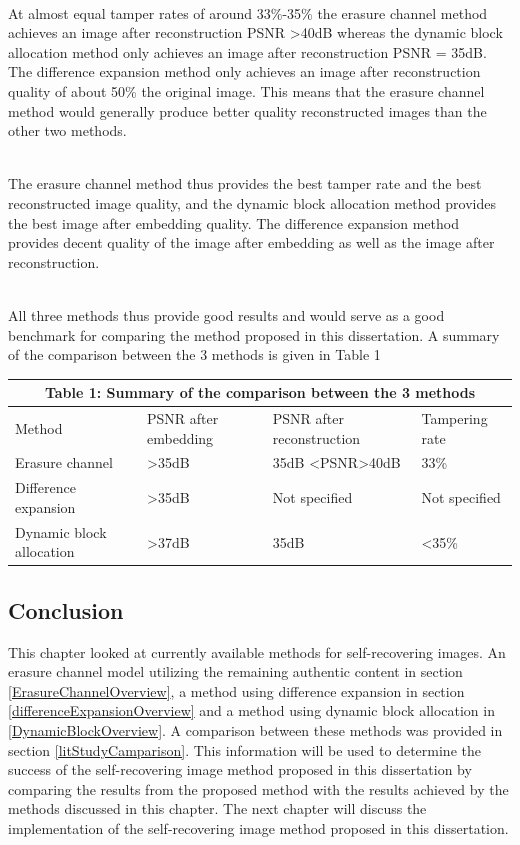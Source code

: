 \documentclass[12pt]{article}
\begin{document}
\hspace{0pt} \\
At almost equal tamper rates of around 33\%-35\% the erasure channel method achieves an image after reconstruction PSNR \textgreater 40dB whereas the dynamic block allocation method only achieves an image after reconstruction PSNR = 35dB.
The difference expansion method only achieves an image after reconstruction quality of about 50\% the original image.
This means that the erasure channel method would generally produce better quality reconstructed images than the other two methods.

\hspace{0pt} \\
The erasure channel method thus provides the best tamper rate and the best reconstructed image quality, and the dynamic block allocation method provides the best image after embedding quality.
The difference expansion method provides decent quality of the image after embedding as well as the image after reconstruction.

\hspace{0pt} \\
All three methods thus provide good results and would serve as a good benchmark for comparing the method proposed in this dissertation.
A summary of the comparison between the 3 methods is given in Table 1

\begin{center}
  \begin{tabular}{| l | l | l | l |}
    \hline
    \multicolumn{4}{|c|}{Table 1: Summary of the comparison between the 3 methods} \\
    \hline
    Method & PSNR after embedding & PSNR after reconstruction & Tampering rate \\ \hline
    Erasure channel& \textgreater35dB & 35dB \textless PSNR\textgreater 40dB & 33\% \\ \hline
    Difference expansion& \textgreater35dB & Not specified & Not specified \\ \hline
    Dynamic block allocation& \textgreater37dB & 35dB & \textless 35\% \\ \hline
    \hline
  \end{tabular}
\end{center}

\subsection{Conclusion}
This chapter looked at currently available methods for self-recovering images.
An erasure channel model utilizing the remaining authentic content in section \ref{ErasureChannelOverview}, a method using difference expansion in section \ref{differenceExpansionOverview} and a method using dynamic block allocation in \ref{DynamicBlockOverview}.
A comparison between these methods was provided in section \ref{litStudyCamparison}.
This information will be used to determine the success of the self-recovering image method proposed in this dissertation by comparing the results from the proposed method with the results achieved by the methods discussed in this chapter.
The next chapter will discuss the implementation of the self-recovering image method proposed in this dissertation.  
\end{document}
